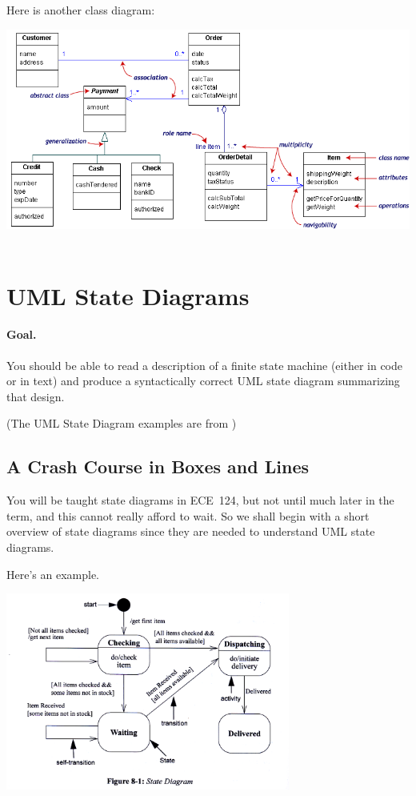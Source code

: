 Here is another class diagram:
\begin{center}
\includegraphics[width=\textwidth]{images/classdiagramno3d.png}
~\cite{uml:prac}
\end{center}

\section*{UML State Diagrams}
\paragraph{Goal.} You should be able to read a description of
a finite state machine (either in code or in text) and produce a
syntactically correct UML state diagram summarizing that design.

(The UML State Diagram examples are from \cite{UMLDistilled})

\subsection*{A Crash Course in Boxes and Lines}
You will be taught state diagrams in ECE~124, but not until much later in the term, and this cannot really afford to wait. So we shall begin with a short overview of state diagrams since they are needed to understand UML state diagrams. 

Here's an example.

\begin{center}
\includegraphics[width=0.7\textwidth]{images/statediagram1}
\end{center}

